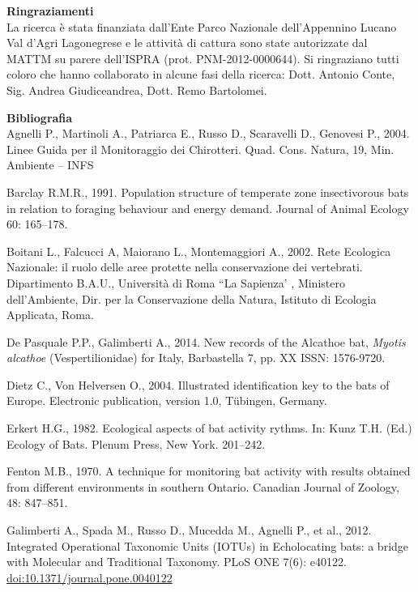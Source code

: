 \begin{multicols}{2}
\vskip3mm

\begin{small}
\noindent\textbf{Ringraziamenti}\\
La ricerca è stata finanziata dall’Ente Parco Nazionale dell’Appennino Lucano Val d’Agri Lagonegrese e le attività di cattura sono state autorizzate dal MATTM su parere dell’ISPRA (prot. PNM-2012-0000644). Si ringraziano tutti coloro che hanno collaborato in alcune fasi della ricerca: Dott. Antonio Conte, Sig. Andrea Giudiceandrea, Dott. Remo Bartolomei. 

\vskip3mm

\noindent\textbf{Bibliografia}\\

Agnelli P., Martinoli A., Patriarca E., Russo D., Scaravelli D., Genovesi  P., 2004. Linee Guida per il Monitoraggio dei Chirotteri. Quad. Cons. Natura, 19, Min. Ambiente – INFS

Barclay R.M.R., 1991. Population structure of temperate zone insectivorous bats in relation to foraging behaviour and energy demand. Journal of Animal Ecology 60: 165--178.

Boitani L., Falcucci A, Maiorano L., Montemaggiori A., 2002. Rete Ecologica Nazionale: il ruolo delle aree protette nella conservazione dei vertebrati. Dipartimento B.A.U., Università di Roma ``La Sapienza' , Ministero dell’Ambiente, Dir. per la Conservazione della Natura, Istituto di Ecologia Applicata, Roma.

De Pasquale P.P., Galimberti A., 2014. New records of the Alcathoe bat, \emph{Myotis alcathoe} (Vespertilionidae) for Italy, Barbastella 7, pp. XX ISSN: 1576-9720.

Dietz C., Von Helversen O., 2004. Illustrated identification key to the bats of Europe. Electronic publication, version 1.0, Tübingen, Germany.

Erkert H.G., 1982. Ecological aspects of bat activity rythms. In: Kunz T.H. (Ed.) Ecology of Bats. Plenum Press, New York. 201--242.

Fenton M.B., 1970. A  technique  for monitoring bat activity with results obtained from different environments in southern Ontario. Canadian Journal of Zoology, 48: 847--851.
 
Galimberti A., Spada M., Russo D., Mucedda M., Agnelli P., et al., 2012. Integrated Operational Taxonomic Units (IOTUs) in Echolocating bats: a bridge with Molecular  and Traditional Taxonomy. PLoS ONE  7(6): e40122. \url{doi:10.1371/journal.pone.0040122}
  

\end{small}
\end{multicols}
